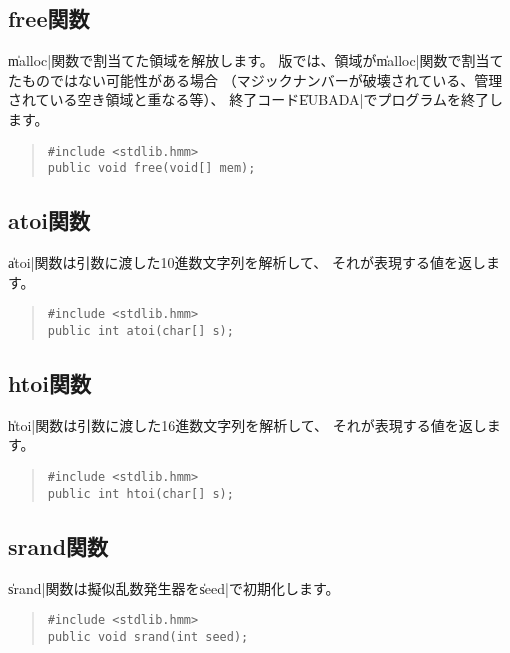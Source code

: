 \subsection{free関数}

\|malloc|関数で割当てた領域を解放します。
\tac 版では、領域が\|malloc|関数で割当てたものではない可能性がある場合
（マジックナンバーが破壊されている、管理されている空き領域と重なる等）、
終了コード\|EUBADA|でプログラムを終了します。

\begin{quote}
\begin{verbatim}
#include <stdlib.hmm>
public void free(void[] mem);
\end{verbatim}
\end{quote}

\subsection{atoi関数}

\|atoi|関数は引数に渡した10進数文字列を解析して、
それが表現する値を返します。

\begin{quote}
\begin{verbatim}
#include <stdlib.hmm>
public int atoi(char[] s);
\end{verbatim}
\end{quote}

\subsection{htoi関数}

\|htoi|関数は引数に渡した16進数文字列を解析して、
それが表現する値を返します。

\begin{quote}
\begin{verbatim}
#include <stdlib.hmm>
public int htoi(char[] s);
\end{verbatim}
\end{quote}

\subsection{srand関数}

\|srand|関数は擬似乱数発生器を\|seed|で初期化します。

\begin{quote}
\begin{verbatim}
#include <stdlib.hmm>
public void srand(int seed);
\end{verbatim}
\end{quote}

